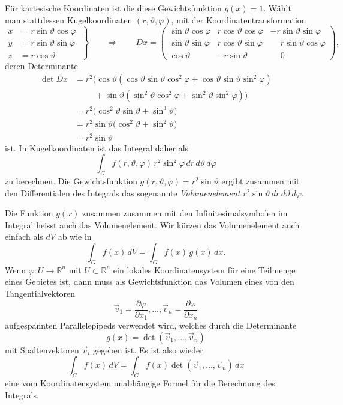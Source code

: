 Für kartesische Koordinaten ist die diese Gewichtsfunktion $g(x)=1$.
Wählt man stattdessen Kugelkoordinaten $(r,\vartheta,\varphi)$, mit der
Koordinatentransformation
\begin{equation}
\left.
\begin{aligned}
x&=r\sin\vartheta\cos\varphi\\
y&=r\sin\vartheta\sin\varphi\\
z&=r\cos\vartheta
\end{aligned}
\;\right\}
\qquad
\Rightarrow
\qquad
Dx
=
\begin{pmatrix}
\sin\vartheta\cos\varphi
	&  r \cos\vartheta\cos\varphi
		& -r\sin\vartheta\sin\varphi\\
\sin\vartheta\sin\varphi
	&  r \cos\vartheta\sin\varphi
		& \phantom{-}r\sin\vartheta\cos\varphi\\
\cos\vartheta
	& -r \sin\vartheta
		& \phantom{-}0
\end{pmatrix},
\end{equation}
deren Determinante
\begin{align*}
\det Dx
&=
r^2\bigl(
\cos\vartheta
(\cos\vartheta \sin\vartheta \cos^2\varphi
+
\cos\vartheta \sin\vartheta \sin^2\varphi
)
\\
&\phantom{=}
\quad
+
\sin\vartheta
(
\sin^2\vartheta \cos^2\varphi
+
\sin^2\vartheta \sin^2\varphi
)
\bigr)
\\
&=
r^2\bigl(
\cos^2\vartheta\sin\vartheta
+
\sin^3\vartheta
\bigr)
\\
&=
r^2
\sin\vartheta
\bigl(
\cos^2\vartheta
+
\sin^2\vartheta
\bigr)
\\
&=
r^2\sin\vartheta
\end{align*}
ist.
In Kugelkoordinaten ist das Integral daher als
\[
\int_G f(r,\vartheta,\varphi)
\,
r^2\sin^2\varphi
\,dr\,d\vartheta\,d\varphi
\]
zu berechnen.
Die Gewichtsfunktion $g(r,\vartheta,\varphi)=r^2\sin\vartheta$ ergibt
zusammen mit den Differentialen des Integrals das sogenannte
{\em Volumenelement}
\(
r^2\sin\vartheta\,dr\,d\vartheta\,d\varphi
\).

Die Funktion $g(x)$ zusammen zusammen mit den Infinitesimalsymbolen
im Integral heisst auch das Volumenelement.
%
Wir kürzen das Volumenelement auch einfach als $dV$ ab wie in
\[
\int_G f(x) \,dV
=
\int_G f(x)\,g(x)\,dx.
\]
Wenn $\varphi\colon U\to\mathbb{R}^n$ mit $U\subset\mathbb{R}^n$ ein lokales
Koordinatensystem für eine Teilmenge eines Gebietes ist, dann muss als
Gewichtsfunktion das Volumen eines von den Tangentialvektoren
\[
\vec{v}_1
=
\frac{\partial\varphi}{\partial x_1}
,\dots,
\vec{v}_n
=
\frac{\partial\varphi}{\partial x_n}
\]
aufgespannten Parallelepipeds verwendet wird, welches durch die Determinante
\[
g(x)
=
\det(\vec{v}_1,\dots,\vec{v}_n)
\]
mit Spaltenvektoren $\vec{v}_i$ gegeben ist.
Es ist also wieder
\[
\int_G f(x)\, dV
=
\int_G f(x) \det(\vec{v}_1,\dots,\vec{v}_n)\,dx
\]
eine vom Koordinatensystem unabhängige Formel für die Berechnung des
Integrals.

